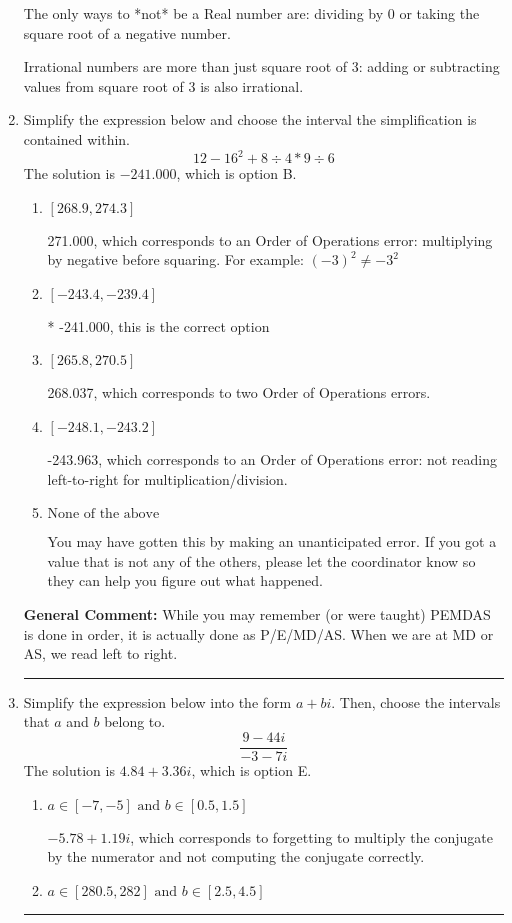 \documentclass{extbook}[14pt]
\newcommand{\litem}[1]{\item #1

\rule{\textwidth}{0.4pt}}
\begin{document}
\begin{enumerate}
{ The only ways to *not* be a Real number are: dividing by 0 or taking the square root of a negative number. 
 
 Irrational numbers are more than just square root of 3: adding or subtracting values from square root of 3 is also irrational.
}
\litem{
Simplify the expression below and choose the interval the simplification is contained within.
\[ 12 - 16^2 + 8 \div 4 * 9 \div 6 \]The solution is \( -241.000 \), which is option B.\begin{enumerate}[label=\Alph*.]
\item \( [268.9, 274.3] \)

 271.000, which corresponds to an Order of Operations error: multiplying by negative before squaring. For example: $(-3)^2 \neq -3^2$
\item \( [-243.4, -239.4] \)

* -241.000, this is the correct option
\item \( [265.8, 270.5] \)

 268.037, which corresponds to two Order of Operations errors.
\item \( [-248.1, -243.2] \)

 -243.963, which corresponds to an Order of Operations error: not reading left-to-right for multiplication/division.
\item \( \text{None of the above} \)

 You may have gotten this by making an unanticipated error. If you got a value that is not any of the others, please let the coordinator know so they can help you figure out what happened.
\end{enumerate}

\textbf{General Comment:} While you may remember (or were taught) PEMDAS is done in order, it is actually done as P/E/MD/AS. When we are at MD or AS, we read left to right.
}
\litem{
Simplify the expression below into the form $a+bi$. Then, choose the intervals that $a$ and $b$ belong to.
\[ \frac{9 - 44 i}{-3 - 7 i} \]The solution is \( 4.84  + 3.36 i \), which is option E.\begin{enumerate}[label=\Alph*.]
\item \( a \in [-7, -5] \text{ and } b \in [0.5, 1.5] \)

 $-5.78  + 1.19 i$, which corresponds to forgetting to multiply the conjugate by the numerator and not computing the conjugate correctly.
\item \( a \in [280.5, 282] \text{ and } b \in [2.5, 4.5] \)


\end{enumerate}}
\end{enumerate}
\end{document}
